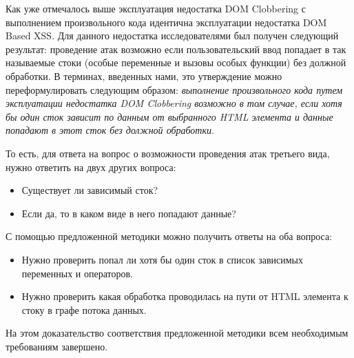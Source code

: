 \bigskip
Как уже отмечалось выше эксплуатация недостатка DOM Clobbering с выполнением произвольного кода идентична эксплуатации недостатка DOM Based XSS. Для данного недостатка исследователями был получен следующий результат: проведение атак возможно если пользовательский ввод попадает в так называемые стоки (особые переменные и вызовы особых функции) без должной обработки. В терминах, введенных нами, это утверждение можно переформулировать следующим образом: \textit{выполнение произвольного кода путем эксплуатации недостатка DOM Clobbering возможно в том случае, если хотя бы один сток зависит по данным от выбранного HTML элемента и данные попадают в этот сток без должной обработки}.


То есть, для ответа на вопрос о возможности проведения атак третьего вида, нужно ответить на двух других вопроса:
\begin{itemize}
	\item Существует ли зависимый сток?
	\item Если да, то в каком виде в него попадают данные?
\end{itemize}


С помощью предложенной методики можно получить ответы на оба вопроса:
\begin{itemize}
	\item Нужно проверить попал ли хотя бы один сток в список зависимых переменных и операторов.
	\item Нужно проверить какая обработка проводилась на пути от HTML элемента к стоку в графе потока данных.
\end{itemize}
\bigskip

На этом доказательство соответствия предложенной методики всем необходимым требованиям завершено.

